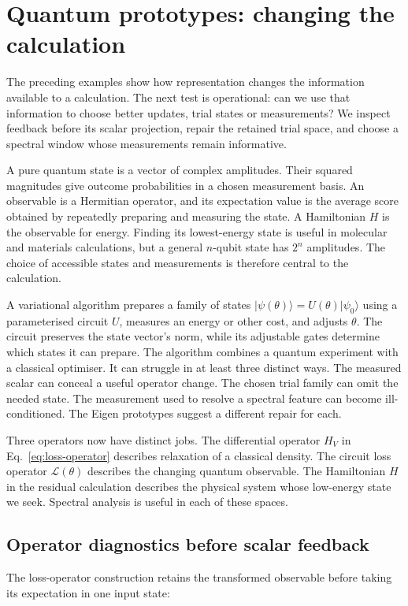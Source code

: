 \section{Quantum prototypes: changing the calculation}
\label{section:quantum-prototypes-changing-the-calculation}

The preceding examples show how representation changes the information available to a calculation. The next test is operational: can we use that information to choose better updates, trial states or measurements? We inspect feedback before its scalar projection, repair the retained trial space, and choose a spectral window whose measurements remain informative.

A pure quantum state is a vector of complex amplitudes. Their squared magnitudes give outcome probabilities in a chosen measurement basis. An observable is a Hermitian operator, and its expectation value is the average score obtained by repeatedly preparing and measuring the state. A Hamiltonian $H$ is the observable for energy. Finding its lowest-energy state is useful in molecular and materials calculations, but a general $n$-qubit state has $2^n$ amplitudes. The choice of accessible states and measurements is therefore central to the calculation.

A variational algorithm prepares a family of states $|\psi(\theta)\rangle=U(\theta)|\psi_0\rangle$ using a parameterised circuit $U$, measures an energy or other cost, and adjusts $\theta$. The circuit preserves the state vector's norm, while its adjustable gates determine which states it can prepare. The algorithm combines a quantum experiment with a classical optimiser. It can struggle in at least three distinct ways. The measured scalar can conceal a useful operator change. The chosen trial family can omit the needed state. The measurement used to resolve a spectral feature can become ill-conditioned. The Eigen prototypes suggest a different repair for each.

Three operators now have distinct jobs. The differential operator $H_V$ in Eq.~\eqref{eq:loss-operator} describes relaxation of a classical density. The circuit loss operator $\mathcal L(\theta)$ describes the changing quantum observable. The Hamiltonian $H$ in the residual calculation describes the physical system whose low-energy state we seek. Spectral analysis is useful in each of these spaces.

\subsection{Operator diagnostics before scalar feedback}
The loss-operator construction retains the transformed observable before taking its expectation in one input state:~\cite{McCaul0c5ec5}

